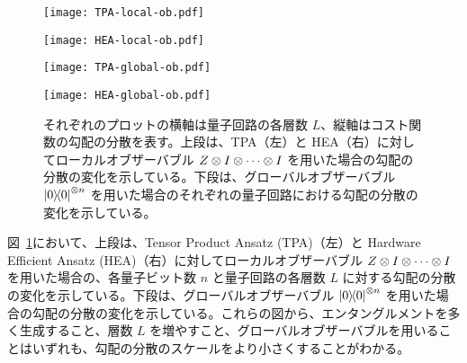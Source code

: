 \begin{figure}[H]
    \begin{minipage}[b]{0.5\columnwidth}
        \centering
        \texttt{[image: TPA-local-ob.pdf]}
    \end{minipage}
    \hspace{0\columnwidth}
    \begin{minipage}[b]{0.5\columnwidth}
        \centering
        \texttt{[image: HEA-local-ob.pdf]}
    \end{minipage}
\end{figure}
\begin{figure}[H]
    \begin{minipage}[b]{0.5\columnwidth}
        \centering
        \texttt{[image: TPA-global-ob.pdf]}
    \end{minipage}
    \hspace{0\columnwidth}
    \begin{minipage}[b]{0.5\columnwidth}
        \centering
        \texttt{[image: HEA-global-ob.pdf]}
    \end{minipage}
    \caption{それぞれのプロットの横軸は量子回路の各層数 $L$、縦軸はコスト関数の勾配の分散を表す。上段は、TPA（左）と HEA（右）に対してローカルオブザーバブル $Z\otimes I \otimes\cdots\otimes I$ を用いた場合の勾配の分散の変化を示している。下段は、グローバルオブザーバブル $\dyad{0}\otn{n}$ を用いた場合のそれぞれの量子回路における勾配の分散の変化を示している。}
    \label{fig:var-ob}
\end{figure}

図~\ref{fig:var-ob}において、上段は、Tensor Product Ansatz (TPA)（左）と Hardware Efficient Ansatz (HEA)（右）に対してローカルオブザーバブル $Z\otimes I \otimes\cdots\otimes I$ を用いた場合の、各量子ビット数 $n$ と量子回路の各層数 $L$ に対する勾配の分散の変化を示している。下段は、グローバルオブザーバブル $\dyad{0}\otn{n}$ を用いた場合の勾配の分散の変化を示している。これらの図から、エンタングルメントを多く生成すること、層数 $L$ を増やすこと、グローバルオブザーバブルを用いることはいずれも、勾配の分散のスケールをより小さくすることがわかる。


